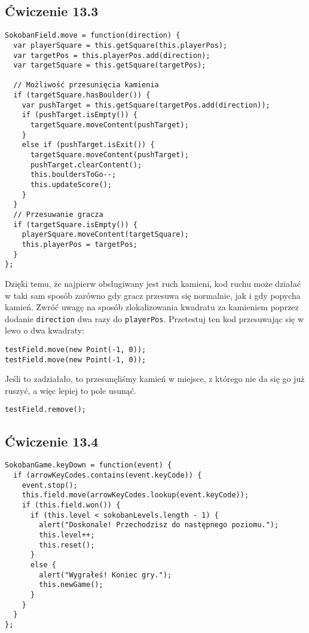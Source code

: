   
\subsection*{Ćwiczenie 13.3}
\label{sol:13.3}
      
\begin{verbatim} 
SokobanField.move = function(direction) {
  var playerSquare = this.getSquare(this.playerPos);
  var targetPos = this.playerPos.add(direction);
  var targetSquare = this.getSquare(targetPos);

  // Możliwość przesunięcia kamienia
  if (targetSquare.hasBoulder()) {
    var pushTarget = this.getSquare(targetPos.add(direction));
    if (pushTarget.isEmpty()) {
      targetSquare.moveContent(pushTarget);
    }
    else if (pushTarget.isExit()) {
      targetSquare.moveContent(pushTarget);
      pushTarget.clearContent();
      this.bouldersToGo--;
      this.updateScore();
    }
  }
  // Przesuwanie gracza
  if (targetSquare.isEmpty()) {
    playerSquare.moveContent(targetSquare);
    this.playerPos = targetPos;
  }
};
\end{verbatim}
    
Dzięki temu, że najpierw obsługiwany jest ruch kamieni, kod ruchu może działać w taki sam sposób zarówno gdy gracz przesuwa się normalnie, jak i gdy popycha kamień. Zwróć uwagę na sposób zlokalizowania kwadratu za kamieniem poprzez dodanie \texttt{direction} dwa razy do \texttt{playerPos}. Przetestuj ten kod przesuwając się w lewo o dwa kwadraty:
    
\begin{verbatim} 
testField.move(new Point(-1, 0));
testField.move(new Point(-1, 0));
\end{verbatim}
    
Jeśli to zadziałało, to przesunęliśmy kamień w miejsce, z którego nie da się go już ruszyć, a więc lepiej to pole usunąć.
    
\begin{verbatim} 
testField.remove();
\end{verbatim}

  
\subsection*{Ćwiczenie 13.4}
\label{sol:13.4}
    
\begin{verbatim} 
SokobanGame.keyDown = function(event) {
  if (arrowKeyCodes.contains(event.keyCode)) {
    event.stop();
    this.field.move(arrowKeyCodes.lookup(event.keyCode));
    if (this.field.won()) {
      if (this.level < sokobanLevels.length - 1) {
        alert("Doskonale! Przechodzisz do następnego poziomu.");
        this.level++;
        this.reset();
      }
      else {
        alert("Wygrałeś! Koniec gry.");
        this.newGame();
      }
    }
  }
};
\end{verbatim}
    
